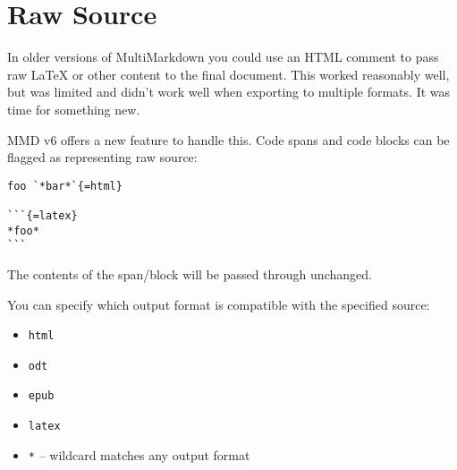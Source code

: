 
\def\mytitle{Raw Source}
\def\myauthor{Fletcher T. Penney}
\def\revised{2018-06-27}




\section{Raw Source }
\label{rawsource}

In older versions of MultiMarkdown you could use an HTML comment to pass raw LaTeX or other content to the final document. This worked reasonably well, but was limited and didn't work well when exporting to multiple formats. It was time for something new.

\gls{MMD} v6 offers a new feature to handle this. Code spans and code blocks can be flagged as representing raw source:

\begin{verbatim}
foo `*bar*`{=html}

```{=latex}
*foo*
```
\end{verbatim}

The contents of the span\slash block will be passed through unchanged.

You can specify which output format is compatible with the specified source:

\begin{itemize}
\item \texttt{html}

\item \texttt{odt}

\item \texttt{epub}

\item \texttt{latex}

\item \texttt{*} -- wildcard matches any output format

\end{itemize}



